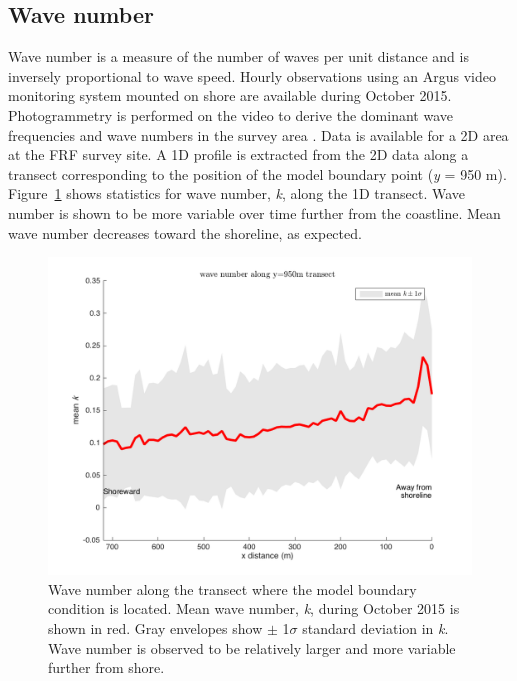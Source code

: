 \subsection{Wave number}

Wave number is a measure of the number of waves per unit distance and is inversely proportional to wave speed. Hourly observations  using an Argus video monitoring system mounted on shore are available during October 2015. Photogrammetry is performed on the video to derive the dominant wave frequencies and wave numbers in the survey area \citep{holman2013}. Data is available for a 2D area at the FRF survey site. A 1D profile is extracted from the 2D data along a transect corresponding to the position of the model boundary point (\textit{y} = 950 m). Figure~\ref{k1Dmean} shows statistics for wave number, \textit{k}, along the 1D transect. Wave number is shown to be more variable over time further from the coastline. Mean wave number decreases toward the shoreline, as expected.



\begin{figure}[h]
\centering
\includegraphics[width=.55\linewidth]{img/k1Dmean_std.png}
\caption{Wave number along the transect where the model boundary condition is located. Mean wave number, \textit{k}, during October 2015 is shown in red. Gray envelopes show $\pm$ 1$\sigma$ standard deviation in \textit{k}. Wave number is observed to be relatively larger and more variable further from shore.}
\label{k1Dmean}
\end{figure}